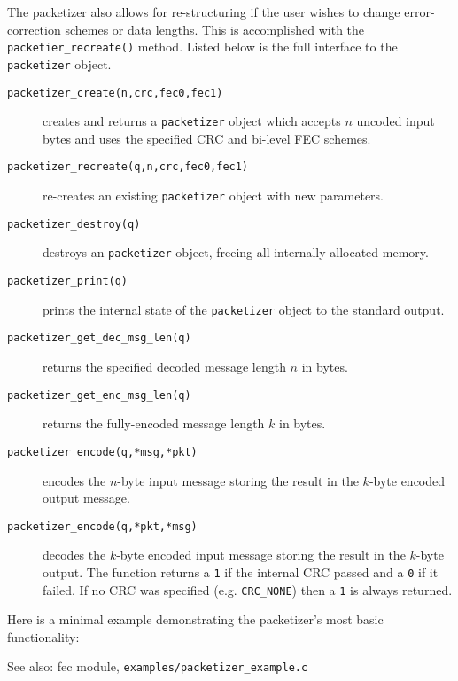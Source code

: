 
The packetizer also allows for re-structuring if the user wishes to change
error-correction schemes or data lengths.  This is accomplished with the
{\tt packetier\_recreate()} method.
Listed below is the full interface to the {\tt packetizer} object.
%
\begin{description}
\item[{\tt packetizer\_create(n,crc,fec0,fec1)}]
    creates and returns a {\tt packetizer} object which accepts $n$
    uncoded input bytes and uses the specified CRC and bi-level FEC
    schemes.
\item[{\tt packetizer\_recreate(q,n,crc,fec0,fec1)}]
    re-creates an existing {\tt packetizer} object with new parameters.
\item[{\tt packetizer\_destroy(q)}]
    destroys an {\tt packetizer} object, freeing all
    internally-allocated memory.
\item[{\tt packetizer\_print(q)}]
    prints the internal state of the {\tt packetizer} object to the
    standard output.
\item[{\tt packetizer\_get\_dec\_msg\_len(q)}]
    returns the specified decoded message length $n$ in bytes.
\item[{\tt packetizer\_get\_enc\_msg\_len(q)}]
    returns the fully-encoded message length $k$ in bytes.
\item[{\tt packetizer\_encode(q,*msg,*pkt)}]
    encodes the $n$-byte input message storing the result in the
    $k$-byte encoded output message.
\item[{\tt packetizer\_encode(q,*pkt,*msg)}]
    decodes the $k$-byte encoded input message storing the result in the
    $k$-byte output.
    The function returns a {\tt 1} if the internal CRC passed
    and a {\tt 0} if it failed.
    If no CRC was specified (e.g. {\tt CRC\_NONE}) then a {\tt 1} is
    always returned.
\end{description}
%
Here is a minimal example demonstrating the packetizer's most basic
functionality:
%

%
See also: fec module, {\tt examples/packetizer\_example.c}


%
%
